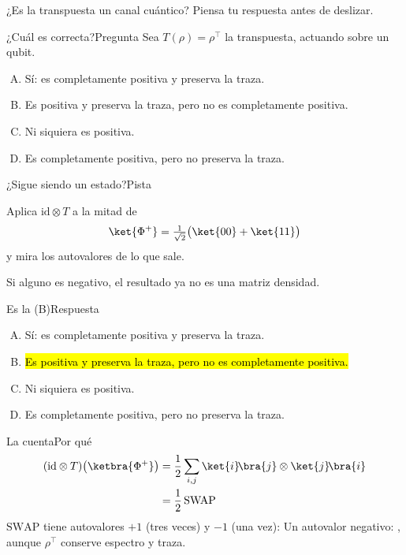 \documentclass[12pt]{beamer}
\begin{document}
  {¿Es la transpuesta un canal cuántico?}
  {Piensa tu respuesta antes de deslizar.}

\begin{frame}{¿Cuál es correcta?}{Pregunta}
Sea $T(\rho) = \rho^{\top}$ la transpuesta, actuando sobre un qubit.
\begin{enumerate}[(A)]
  \item Sí: es completamente positiva y preserva la traza.
  \item Es positiva y preserva la traza, pero no es completamente positiva.
  \item Ni siquiera es positiva.
  \item Es completamente positiva, pero no preserva la traza.
\end{enumerate}
\end{frame}

\begin{frame}{¿Sigue siendo un estado?}{Pista}
\begin{notebox}
Aplica $\mathrm{id}\otimes T$ a la mitad de
\[
  \ket{\Phi^+} = \tfrac{1}{\sqrt2}\big(\ket{00} + \ket{11}\big)
\]
y mira los autovalores de lo que sale.
\end{notebox}
Si alguno es negativo, el resultado ya no es una matriz densidad.
\end{frame}

\begin{frame}{Es la (B)}{Respuesta}
\begin{enumerate}[(A)]
  \item {\color{igMuted}Sí: es completamente positiva y preserva la traza.}
  \item \hl{Es positiva y preserva la traza, pero no es completamente
        positiva.} {\color{igAccent}\checkmark}
  \item {\color{igMuted}Ni siquiera es positiva.}
  \item {\color{igMuted}Es completamente positiva, pero no preserva la traza.}
\end{enumerate}
\end{frame}

\begin{frame}{La cuenta}{Por qué}
\begin{align*}
  (\mathrm{id}\otimes T)\big(\ketbra{\Phi^+}\big)
  &= \frac12\sum_{i,j}\ket{i}\!\bra{j}\otimes\ket{j}\!\bra{i}\\
  &= \frac12\,\mathrm{SWAP}
\end{align*}
$\mathrm{SWAP}$ tiene autovalores $+1$ (tres veces) y $-1$ (una vez):
Un autovalor negativo: , aunque
$\rho^{\top}$ conserve espectro y traza.
\end{frame}
\end{document}
